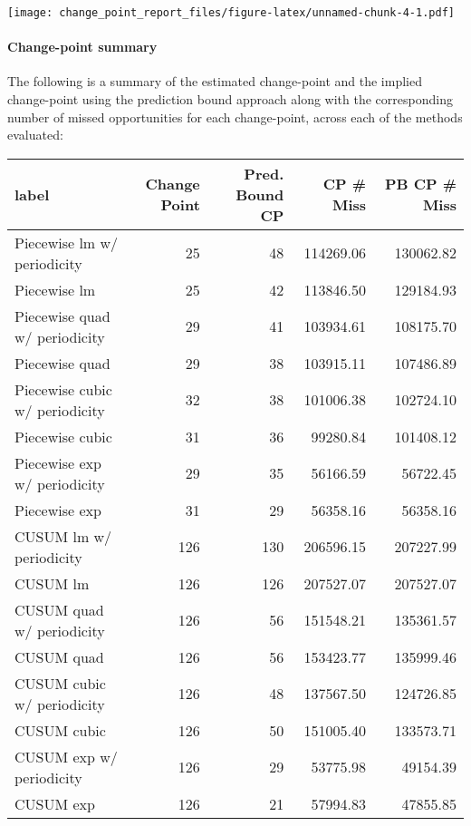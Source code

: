 \documentclass[
]{article}
\begin{document}
\texttt{[image: change\_point\_report\_files/figure-latex/unnamed-chunk-4-1.pdf]}

\hypertarget{change-point-summary}{%
\paragraph{Change-point summary}\label{change-point-summary}}

The following is a summary of the estimated change-point and the implied
change-point using the prediction bound approach along with the
corresponding number of missed opportunities for each change-point,
across each of the methods evaluated:

\begin{table}
\centering
\begin{tabular}{l|r|r|r|r}
\hline
label & Change Point & Pred. Bound CP & CP \# Miss  & PB CP \# Miss\\
\hline
Piecewise lm w/ periodicity & 25 & 48 & 114269.06 & 130062.82\\
\hline
Piecewise lm & 25 & 42 & 113846.50 & 129184.93\\
\hline
Piecewise quad w/ periodicity & 29 & 41 & 103934.61 & 108175.70\\
\hline
Piecewise quad & 29 & 38 & 103915.11 & 107486.89\\
\hline
Piecewise cubic w/ periodicity & 32 & 38 & 101006.38 & 102724.10\\
\hline
Piecewise cubic & 31 & 36 & 99280.84 & 101408.12\\
\hline
Piecewise exp w/ periodicity & 29 & 35 & 56166.59 & 56722.45\\
\hline
Piecewise exp & 31 & 29 & 56358.16 & 56358.16\\
\hline
CUSUM lm w/ periodicity & 126 & 130 & 206596.15 & 207227.99\\
\hline
CUSUM lm & 126 & 126 & 207527.07 & 207527.07\\
\hline
CUSUM quad w/ periodicity & 126 & 56 & 151548.21 & 135361.57\\
\hline
CUSUM quad & 126 & 56 & 153423.77 & 135999.46\\
\hline
CUSUM cubic w/ periodicity & 126 & 48 & 137567.50 & 124726.85\\
\hline
CUSUM cubic & 126 & 50 & 151005.40 & 133573.71\\
\hline
CUSUM exp w/ periodicity & 126 & 29 & 53775.98 & 49154.39\\
\hline
CUSUM exp & 126 & 21 & 57994.83 & 47855.85\\
\hline
\end{tabular}
\end{table}
\end{document}
